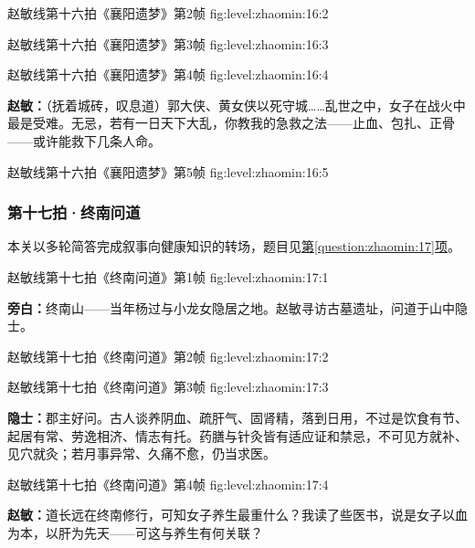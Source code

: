   {赵敏线第十六拍《襄阳遗梦》第2帧}
  {fig:level:zhaomin:16:2}
  {\scriptsize}
  {\mbox{}}

  {赵敏线第十六拍《襄阳遗梦》第3帧}
  {fig:level:zhaomin:16:3}
  {\scriptsize}
  {\mbox{}}

\clearpage

  {赵敏线第十六拍《襄阳遗梦》第4帧}
  {fig:level:zhaomin:16:4}
  {\scriptsize}
  {\textbf{赵敏：}（抚着城砖，叹息道）郭大侠、黄女侠以死守城……乱世之中，女子在战火中最是受难。无忌，若有一日天下大乱，你教我的急救之法——止血、包扎、正骨——或许能救下几条人命。\par}

  {赵敏线第十六拍《襄阳遗梦》第5帧}
  {fig:level:zhaomin:16:5}
  {\scriptsize}
  {\mbox{}}

\subsubsection{第十七拍·终南问道}\label{plot:zhaomin:17}
本关以多轮简答完成叙事向健康知识的转场，题目见\hyperref[question:zhaomin:17]{第\ref*{question:zhaomin:17}项}。

  {赵敏线第十七拍《终南问道》第1帧}
  {fig:level:zhaomin:17:1}
  {\scriptsize}
  {\textbf{旁白：}终南山——当年杨过与小龙女隐居之地。赵敏寻访古墓遗址，问道于山中隐士。\par}

\clearpage

  {赵敏线第十七拍《终南问道》第2帧}
  {fig:level:zhaomin:17:2}
  {\scriptsize}
  {\mbox{}}

  {赵敏线第十七拍《终南问道》第3帧}
  {fig:level:zhaomin:17:3}
  {\scriptsize}
  {\textbf{隐士：}郡主好问。古人谈养阴血、疏肝气、固肾精，落到日用，不过是饮食有节、起居有常、劳逸相济、情志有托。药膳与针灸皆有适应证和禁忌，不可见方就补、见穴就灸；若月事异常、久痛不愈，仍当求医。\par}

  {赵敏线第十七拍《终南问道》第4帧}
  {fig:level:zhaomin:17:4}
  {\scriptsize}
  {\textbf{赵敏：}道长远在终南修行，可知女子养生最重什么？我读了些医书，说是女子以血为本，以肝为先天——可这与养生有何关联？\par}

